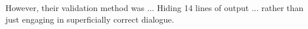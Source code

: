However, their validation method was
... Hiding 14 lines of output ...
 rather than just engaging in superficially correct dialogue.






